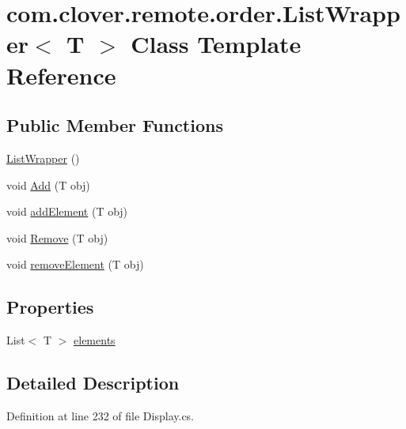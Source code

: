\hypertarget{classcom_1_1clover_1_1remote_1_1order_1_1_list_wrapper}{}\section{com.\+clover.\+remote.\+order.\+List\+Wrapper$<$ T $>$ Class Template Reference}
\label{classcom_1_1clover_1_1remote_1_1order_1_1_list_wrapper}
\subsection*{Public Member Functions}
\begin{DoxyCompactItemize}
\item 
\hyperlink{classcom_1_1clover_1_1remote_1_1order_1_1_list_wrapper_aae2fadf9a7c952b449fd3637a2adca7e}{List\+Wrapper} ()
\item 
void \hyperlink{classcom_1_1clover_1_1remote_1_1order_1_1_list_wrapper_ad7beebf272746d39d91cbdff4027a24c}{Add} (T obj)
\item 
void \hyperlink{classcom_1_1clover_1_1remote_1_1order_1_1_list_wrapper_aa4672fe9e771699ac985603a135dba56}{add\+Element} (T obj)
\item 
void \hyperlink{classcom_1_1clover_1_1remote_1_1order_1_1_list_wrapper_a9517ce44cfaa8f18ec27f145567e5b41}{Remove} (T obj)
\item 
void \hyperlink{classcom_1_1clover_1_1remote_1_1order_1_1_list_wrapper_a344b12648795d52a45e0cb9f5bd134b0}{remove\+Element} (T obj)
\end{DoxyCompactItemize}
\subsection*{Properties}
\begin{DoxyCompactItemize}
\item 
List$<$ T $>$ \hyperlink{classcom_1_1clover_1_1remote_1_1order_1_1_list_wrapper_a9f77364faa9e5e397c1788e61e15e0cd}{elements}
\end{DoxyCompactItemize}


\subsection{Detailed Description}


Definition at line 232 of file Display.\+cs.



